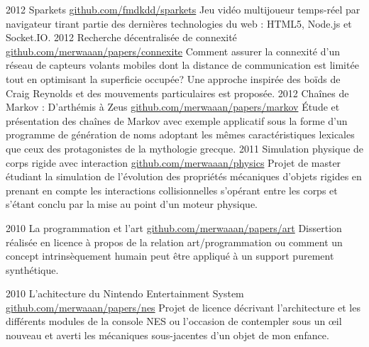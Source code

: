 \documentclass[]{friggeri-cv}
\begin{document}
\begin{entrylist}
  \entry
    {2012}
    {Sparkets}
    {\href{http://github.com/fmdkdd/sparkets}{github.com/fmdkdd/sparkets}}
    {Jeu vidéo multijoueur temps-réel par navigateur tirant partie des
      dernières technologies du web : HTML5, Node.js et Socket.IO.}
  \entry
    {2012}
    {Recherche décentralisée de connexité}
    {\href{https://github.com/merwaaan/papers/blob/master/connexite/rapport.pdf?raw=true}{github.com/merwaaan/papers/connexite}}
    {Comment assurer la connexité d'un réseau de capteurs volants
      mobiles dont la distance de communication est limitée tout en
      optimisant la superficie occupée? Une approche inspirée des
      boïds de Craig Reynolds et des mouvements particulaires est
      proposée.}
  \entry
    {2012}
    {Chaînes de Markov : D'arthémis à Zeus}
    {\href{https://github.com/merwaaan/papers/blob/master/markov/rapport.pdf?raw=true}{github.com/merwaaan/papers/markov}}
    {\'Etude et présentation des chaînes de Markov avec exemple
      applicatif sous la forme d'un programme de génération de noms
      adoptant les mêmes caractéristiques lexicales que ceux des
      protagonistes de la mythologie grecque.}
  \entry
    {2011}
    {Simulation physique de corps rigide avec interaction}
    {\href{http://github.com/merwaaan/physics}{github.com/merwaaan/physics}}
    {Projet de master étudiant la simulation de l'évolution des
      propriétés mécaniques d'objets rigides en prenant en compte les
      interactions collisionnelles s'opérant entre les corps et
      s'étant conclu par la mise au point d'un moteur physique.}

  \entry
    {2010}
    {La programmation et l'art}
    {\href{http://github.com/merwaaan/papers/blob/master/art/progart.pdf?raw=true}{github.com/merwaaan/papers/art}}
    {Dissertion réalisée en licence à propos de la relation
      art/programmation ou comment un concept intrinsèquement humain
      peut être appliqué à un support purement synthétique.}

  \entry
    {2010}
    {L'achitecture du Nintendo Entertainment System}
    {\href{https://github.com/merwaaan/papers/blob/master/nes/archines.pdf?raw=true}{github.com/merwaaan/papers/nes}}
    {Projet de licence décrivant l'architecture et les différents
      modules de la console NES ou l'occasion de contempler sous un
      \oe il nouveau et averti les mécaniques sous-jacentes d'un objet
      de mon enfance.}

\end{entrylist}
\end{document}
